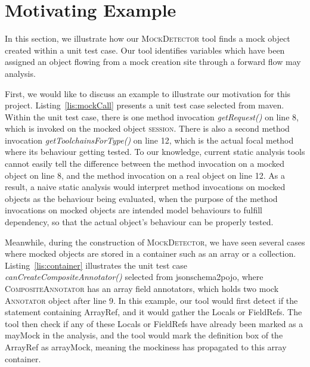 \section{Motivating Example}
\label{sec:motivating-example}

In this section, we illustrate how our \textsc{MockDetector} tool finds a mock object created within a unit test case. Our tool identifies variables which have been assigned an object flowing from a mock creation site through a forward flow may analysis.

First, we would like to discuss an example to illustrate our motivation for this project. Listing~\ref{lis:mockCall} presents a unit test case selected from maven. Within the unit test case, there is one method invocation \textit{getRequest()} on line 8, which is invoked on the mocked object \textsc{session}. There is also a second method invocation \textit{getToolchainsForType()} on line 12, which is the actual focal method where its behaviour getting tested. To our knowledge, current static analysis tools cannot easily tell the difference between the method invocation on a mocked object on line 8, and the method invocation on a real object on line 12. As a result, a naive static analysis would interpret method invocations on mocked objects as the behaviour being evaluated, when the purpose of the method invocations on mocked objects are intended model behaviours to fulfill dependency, so that the actual object's behaviour can be properly tested.

Meanwhile, during the construction of \textsc{MockDetector}, we have seen several cases where mocked objects are stored in a container such as an array or a collection. Listing~\ref{lis:container} illustrates the unit test case \textit{canCreateCompositeAnnotator()} selected from jsonschema2pojo, where \textsc{CompositeAnnotator} has an array field annotators, which holds two mock \textsc{Annotator} object after line 9. In this example, our tool would first detect if the statement containing ArrayRef, and it would gather the Locals or FieldRefs. The tool then check if any of these Locals or FieldRefs have already been marked as a mayMock in the analysis, and the tool would mark the definition box of the ArrayRef as arrayMock, meaning the mockiness has propagated to this array container. 

‎

